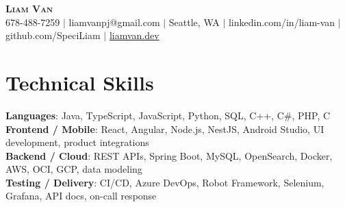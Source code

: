 \documentclass[letterpaper,11pt]{article}
\begin{document}

%
\begin{center}
    \textbf{\Huge \scshape Liam Van} \\ \vspace{1pt}
    \small 678-488-7259 $|$ \small {liamvanpj@gmail.com} $|$ Seattle, WA
 {{$|$ linkedin.com/in/liam-van} {$|$ github.com/SpeciLiam} {$|$ \href{https://liamvan.dev}{liamvan.dev}}}

\end{center}

\section{Technical Skills}
 \begin{itemize}[leftmargin=0.15in, label={}]
    \small{\item{
     \textbf{Languages}{: Java, TypeScript, JavaScript, Python, SQL, C++, C\#, PHP, C} \\
     \textbf{Frontend / Mobile}{: React, Angular, Node.js, NestJS, Android Studio, UI development, product integrations} \\
     \textbf{Backend / Cloud}{: REST APIs, Spring Boot, MySQL, OpenSearch, Docker, AWS, OCI, GCP, data modeling} \\
     \textbf{Testing / Delivery}{: CI/CD, Azure DevOps, Robot Framework, Selenium, Grafana, API docs, on-call response} \\
    }}
 \end{itemize}
%

\end{document}
